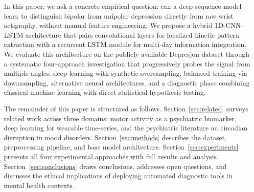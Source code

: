 In this paper, we ask a concrete empirical question: can a deep sequence model learn to distinguish bipolar from unipolar depression directly from raw wrist actigraphy, without manual feature engineering. We propose a hybrid 1D-CNN-LSTM architecture that pairs convolutional layers for localized kinetic pattern extraction with a recurrent LSTM module for multi-day information integration. We evaluate this architecture on the publicly available Depresjon dataset \cite{garcia2018depresjon} through a systematic four-approach investigation that progressively probes the signal from multiple angles: deep learning with synthetic oversampling, balanced training via downsampling, alternative neural architectures, and a diagnostic phase combining classical machine learning with direct statistical hypothesis testing.

The remainder of this paper is structured as follows. Section~\ref{sec:related} surveys related work across three domains: motor activity as a psychiatric biomarker, deep learning for wearable time-series, and the psychiatric literature on circadian disruption in mood disorders. Section~\ref{sec:methods} describes the dataset, preprocessing pipeline, and base model architecture. Section~\ref{sec:experiments} presents all four experimental approaches with full results and analysis. Section~\ref{sec:conclusions} draws conclusions, addresses open questions, and discusses the ethical implications of deploying automated diagnostic tools in mental health contexts.
